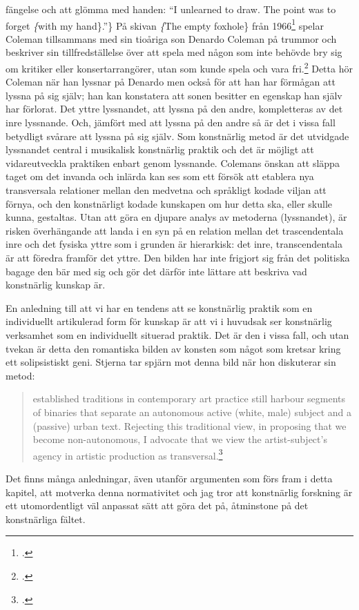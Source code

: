 \documentclass[11pt]{article}
\begin{document}
    fängelse och att glömma med handen: ``I unlearned to draw. The
    point was to forget \emph\{with my
	hand\}.''\} På skivan \emph\{The empty
    foxhole\} från 1966\footcite{coleman66} spelar Coleman tillsammans
med sin tioåriga son Denardo Coleman på trummor och beskriver sin
tillfredställelse över att spela med någon som inte behövde bry sig om
kritiker eller konsertarrangörer, utan som kunde spela och vara
fri.\footcite[s.121]{litzweiler92} Detta hör Coleman när han lyssnar
på Denardo men också för att han har förmågan att lyssna på sig själv;
han kan konstatera att sonen besitter en egenskap han själv har
förlorat. Det yttre lyssnandet, att lyssna på den andre, kompletteras
av det inre lyssnande. Och, jämfört med att lyssna på den andre så är
det i vissa fall betydligt svårare att lyssna på sig själv. Som
konstnärlig metod är det utvidgade lyssnandet central i musikalisk
konstnärlig praktik och det är möjligt att vidareutveckla praktiken
enbart genom lyssnande. Colemans önskan att släppa taget om det
invanda och inlärda kan ses som ett försök att etablera nya
transversala relationer mellan den medvetna och språkligt kodade
viljan att förnya, och den konstnärligt kodade kunskapen om hur detta
ska, eller skulle kunna, gestaltas. Utan att göra en djupare analys av
metoderna (lyssnandet), är risken överhängande att landa i en syn på
en relation mellan det trascendentala inre och det fysiska yttre som i
grunden är hierarkisk: det inre, transcendentala är att föredra
framför det yttre. Den bilden har inte frigjort sig från det politiska
bagage den bär med sig och gör det därför inte lättare att beskriva
vad konstnärlig kunskap är.

En anledning till att vi har en tendens att se konstnärlig praktik som
en individuellt artikulerad form för kunskap är att vi i huvudsak ser
konstnärlig verksamhet som en individuellt situerad praktik. Det är
den i vissa fall, och utan tvekan är detta den romantiska
bilden av konsten som något som kretsar kring ett solipsistiskt
geni. Stjerna tar spjärn mot denna bild när hon diskuterar sin metod:
\begin{quote}
    established traditions in contemporary art practice still harbour
    segments of binaries that separate an autonomous active (white,
    male) subject and a (passive) urban text. Rejecting this
    traditional view, in proposing that we become non-autonomous, I
    advocate that we view the artist-subject’s agency in artistic
    production as transversal.\footcite[s.119-20]{Stjerna2018}
\end{quote}
Det finns många anledningar, även utanför argumenten som förs fram i
detta kapitel, att motverka denna normativitet och jag tror att
konstnärlig forskning är ett utomordentligt väl anpassat sätt att göra
det på, åtminstone på det konstnärliga fältet.
\end{document}
